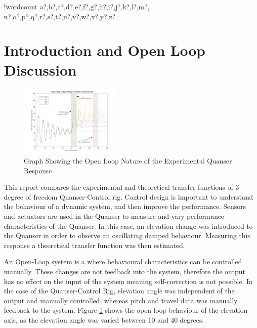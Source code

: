 \documentclass[11pt]{article}
\newcounter{words}
\newenvironment{counted}{%
  \setcounter{words}{0}
  \SearchList!{wordcount}{\stepcounter{words}}
    {a?,b?,c?,d?,e?,f?,g?,h?,i?,j?,k?,l?,m?,
    n?,o?,p?,q?,r?,s?,t?,u?,v?,w?,x?,y?,z?}
  \UndoBoundary{'}
  \SearchOrder{p;}}{%
  \StopSearching}
\begin{document}
\clearpage
{}
\begin{counted} %
\section{Introduction and Open Loop
Discussion}\label{introduction-and-open-loop-discussion}

\begin{figure}
  \begin{center}
  \vspace{-20pt}
  \includegraphics[trim = 50 20 50 10, clip, width=0.44\textwidth]{intrograph.pdf}
  \end{center}
  \caption{Graph Showing the Open Loop Nature of the Experimental Quanser Response}
  \label{intrograph}
  \vspace{-15pt}
\end{figure}

This report compares the experimental and theoretical transfer functions
of 3 degree of freedom Quanser-Control rig. Control design is important
to understand the behaviour of a dynamic system, and then improve the
performance. Sensors and actuators are used in the Quanser to measure
and vary performance characteristics of the Quanser. In this case, an
elevation change was introduced to the Quanser in order to observe an
oscillating damped behaviour. Measuring this response a theoretical
transfer function was then estimated.

An Open-Loop system is a where behavioural characteristics can be
controlled manually. These changes are not feedback into the system,
therefore the output has no effect on the input of the system
\cite{openloop} meaning self-correction is not possible. In the case of
the Quanser-Control Rig, elevation angle was independent of the output
and manually controlled, whereas pitch and travel data was manually
feedback to the system. Figure \ref{intrograph} shows the open loop
behaviour of the elevation axis, as the elevation angle was varied
between 10 and 40 degrees.


\end{counted}
\end{document}
